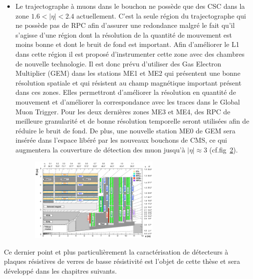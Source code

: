 \begin{itemize}[label=$\bullet$]
\begin{figure}[ht!]
		\label{L1_2}
	\end{figure}
\item Le trajectographe à muons dans le bouchon ne possède que des CSC dans la zone $1.6<|\eta|<2.4$ actuellement. C'est la seule région du trajectographe qui ne possède pas de RPC afin d'assurer une redondance malgré le fait qu'il s'agisse d'une région dont la résolution de la quantité de mouvement est moins bonne et dont le bruit de fond est important. Afin d'améliorer le L1 dans cette région il est proposé d'instrumenter cette zone avec des chambres de nouvelle technologie. Il est donc prévu d'utiliser des Gas Electron Multiplier (GEM) dans les stations ME1 et ME2 qui présentent une bonne résolution spatiale et qui résistent au champ magnétique important présent dans ces zones. Elles permettront d'améliorer la résolution en quantité de mouvement et d'améliorer la correspondance avec les traces dans le Global Muon Trigger. Pour les deux dernières zones ME3 et ME4, des RPC de meilleure granularité et de bonne résolution temporelle seront utilisées afin de réduire le bruit de fond.  De plus, une nouvelle station ME0 de GEM sera insérée dans l'espace libéré par les nouveaux bouchons de CMS, ce qui augmentera la couverture de détection des muon jusqu'à $|\eta|\approx3$ (cf.fig~\ref{end}). 
	\begin{figure}[ht!]
	\centering
	\includegraphics[width=0.60\textwidth]{CMS/endcap.png}
	\label{end}
\end{figure}
\end{itemize}
Ce dernier point et plus particulièrement la caractérisation de détecteurs à plaques résistives de verres de basse résistivité est l'objet de cette thèse et sera développé dans les chapitres suivants.